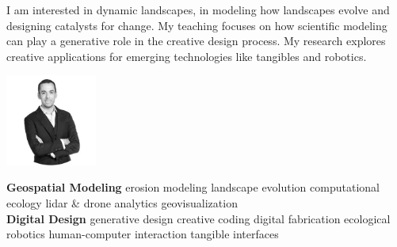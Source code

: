 \documentclass[10pt]{developercv} %
\begin{document}
\begin{minipage}[t]{0.35\textwidth}
\newline
\end{minipage}
\hfill
\begin{minipage}[t]{0.2\textwidth}
\end{minipage}
\hfill
\begin{minipage}[t]{0.35\textwidth}
\newline
\end{minipage}

\begin{minipage}[t]{0.35\textwidth}
	\vspace{-\baselineskip}

	I am interested in dynamic landscapes, 
	in modeling how landscapes evolve
	and designing catalysts for change. 
	My teaching focuses on how 
	scientific modeling can play a generative role
	in the creative design process.
	My research explores creative applications
	for emerging technologies like tangibles and robotics.

	

\end{minipage}
\hfill
\begin{minipage}[t]{0.2\textwidth} 
	\vspace{-\baselineskip} 
	\includegraphics[width=3cm]{images/baharmon-2.jpg}
\end{minipage}
\hfill
\begin{minipage}[t]{0.35\textwidth} 
	\vspace{-\baselineskip} 
				
		\textbf{Geospatial Modeling}
			erosion modeling \textbullet{}
			landscape evolution \textbullet{}
			computational ecology \textbullet{}
			lidar \& drone analytics \textbullet{}
			geovisualization\\
			
		\textbf{Digital Design}
		generative design \textbullet{}
		creative coding \textbullet{}
		digital fabrication \textbullet{}
		ecological robotics \textbullet{}
		human-computer interaction \textbullet{}
		tangible interfaces\\
\end{minipage}
\end{document}
